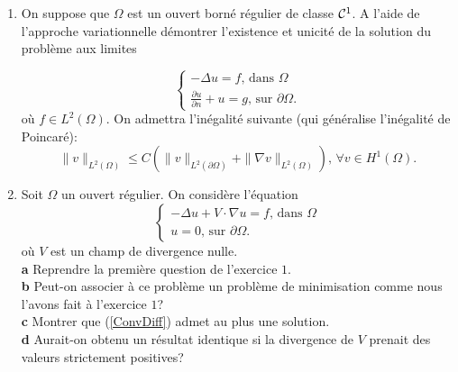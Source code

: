 \documentclass[12pt,a4paper]{article}
\begin{document}
\begin{enumerate}
\item On suppose que $\Omega$ est un ouvert borné régulier de classe ${\cal C}^1$. A l'aide de l'approche variationnelle démontrer l'existence et unicité de la solution du problème aux limites

\begin{equation}\label{Robin}
\begin{cases}
-\Delta u = f,\,\text{dans }\Omega\\
\frac{\partial u}{\partial n} + u = g,\,\text{sur }\partial\Omega.
\end{cases}
\end{equation}
où $f\in L^2(\Omega)$. On admettra l'inégalité suivante (qui généralise l'inégalité de Poincaré):
$$
\|v\|_{L^2(\Omega)} \le C (\|v\|_{L^2(\partial\Omega)} +\| \nabla v\|_{L^2(\Omega)} ),\, \forall v \in H^1(\Omega).
$$


\item Soit $\Omega$ un ouvert r\'egulier. On consid\`ere l'\'equation 
\begin{equation}\label{ConvDiff}
\begin{cases}
-\Delta u +V\cdot\nabla u = f,\,\text{dans }\Omega\\
u = 0,\,\text{sur }\partial\Omega.
\end{cases}
\end{equation}
o\`u $V$ est un champ de divergence nulle. \\
{\bf a} Reprendre la premi\`ere question de l'exercice $1$. \\
{\bf b} Peut-on associer à ce probl\`eme un probl\`eme de
minimisation comme nous l'avons fait à l'exercice $1$? \\
{\bf c} Montrer que (\ref{ConvDiff}) admet au plus une solution. \\
{\bf d} Aurait-on obtenu un r\'esultat identique si la divergence de
$V$ prenait des valeurs strictement positives?



\end{enumerate}
\end{document}
